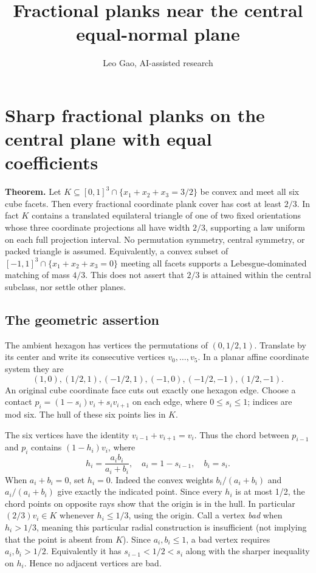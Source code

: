 \documentclass[
  10pt,
]{article}
\title{Fractional planks near the central equal-normal plane}
\author{Leo Gao, AI-assisted research}
\date{}
\begin{document}
\maketitle

\section{Sharp fractional planks on the central plane with equal
coefficients}\label{sharp-fractional-planks-on-the-central-plane-with-equal-coefficients}


\textbf{Theorem.} Let \(K\subseteq[0,1]^3\cap\{x_1+x_2+x_3=3/2\}\) be
convex and meet all six cube facets. Then every fractional coordinate
plank cover has cost at least \(2/3\). In fact \(K\) contains a
translated equilateral triangle of one of two fixed orientations whose
three coordinate projections all have width \(2/3\), supporting a law
uniform on each full projection interval. No permutation symmetry,
central symmetry, or packed triangle is assumed. Equivalently, a convex
subset of \([-1,1]^3\cap\{x_1+x_2+x_3=0\}\) meeting all facets supports
a Lebesgue-dominated matching of mass \(4/3\). This does not assert that
\(2/3\) is attained within the central subclass, nor settle other
planes.

\subsection{The geometric assertion}\label{the-geometric-assertion}

The ambient hexagon has vertices the permutations of \((0,1/2,1)\).
Translate by its center and write its consecutive vertices
\(v_0,\ldots,v_5\). In a planar affine coordinate system they are \[
(1,0), (1/2,1), (-1/2,1), (-1,0), (-1/2,-1), (1/2,-1).
\] An original cube coordinate face cuts out exactly one hexagon edge.
Choose a contact \(p_i=(1-s_i)v_i+s_i v_{i+1}\) on each edge, where
\(0\le s_i\le1\); indices are mod six. The hull of these six points lies
in \(K\).

The six vertices have the identity \(v_{i-1}+v_{i+1}=v_i\). Thus the
chord between \(p_{i-1}\) and \(p_i\) contains \((1-h_i)v_i\), where \[
h_i=\frac{a_i b_i}{a_i+b_i},\quad a_i=1-s_{i-1},\quad b_i=s_i.
\] When \(a_i+b_i=0\), set \(h_i=0\). Indeed the convex weights
\(b_i/(a_i+b_i)\) and \(a_i/(a_i+b_i)\) give exactly the indicated
point. Since every \(h_i\) is at most 1/2, the chord points on opposite
rays show that the origin is in the hull. In particular
\((2/3)v_i\in K\) whenever \(h_i\le1/3\), using the origin. Call a
vertex \emph{bad} when \(h_i>1/3\), meaning this particular radial
construction is insufficient (not implying that the point is absent from
\(K\)). Since \(a_i,b_i\le1\), a bad vertex requires \(a_i,b_i>1/2\).
Equivalently it has \(s_{i-1}<1/2<s_i\) along with the sharper
inequality on \(h_i\). Hence no adjacent vertices are bad.
\end{document}
